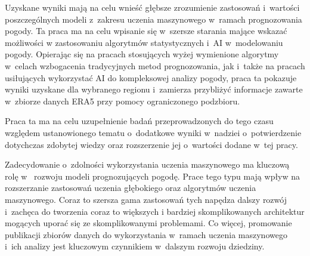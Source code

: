 Uzyskane wyniki mają na celu wnieść głębsze zrozumienie zastosowań i~wartości 
poszczególnych modeli z~zakresu uczenia maszynowego w~ramach prognozowania pogody.
Ta praca ma na celu wpisanie się w~szersze starania mające wskazać możliwości
w zastosowaniu algorytmów statystycznych i~AI w~modelowaniu pogody. Opierając
się na pracach stosujących wyżej wymienione algorytmy w~celach wzbogacenia
tradycyjnych metod prognozowania, jak i~także na pracach usiłujących wykorzystać AI
do kompleksowej analizy pogody, praca ta pokazuje wyniki uzyskane dla wybranego
regionu i~zamierza przybliżyć informacje zawarte w~zbiorze danych ERA5 przy pomocy
ograniczonego podzbioru.

Praca ta ma na celu uzupełnienie badań przeprowadzonych do tego czasu względem 
ustanowionego tematu o~dodatkowe wyniki w~nadziei o~potwierdzenie dotychczas 
zdobytej wiedzy oraz rozszerzenie jej o~wartości dodane w~tej pracy.

Zadecydowanie o~zdolności wykorzystania uczenia maszynowego ma kluczową rolę w~
rozwoju modeli prognozujących pogodę. Prace tego typu mają wpływ na rozszerzanie
zastosowań uczenia głębokiego oraz algorytmów uczenia maszynowego. Coraz to szersza
gama zastosowań tych napędza dalszy rozwój i~zachęca do tworzenia coraz to większych
i bardziej skomplikowanych architektur mogących uporać się ze skomplikowanymi problemami.
Co więcej, promowanie publikacji zbiorów danych do wykorzystania w~ramach uczenia
maszynowego i~ich analizy jest kluczowym czynnikiem w~dalszym rozwoju dziedziny.